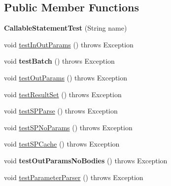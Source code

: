 \subsection*{Public Member Functions}
\begin{DoxyCompactItemize}
\item 
\mbox{\label{classtestsuite_1_1simple_1_1_callable_statement_test_aea47c080476cb1ba38504913a365d668}} 
{\bfseries Callable\+Statement\+Test} (String name)
\item 
void \mbox{\hyperlink{classtestsuite_1_1simple_1_1_callable_statement_test_aff9447e7125f78c20b0eab4c5646b013}{test\+In\+Out\+Params}} ()  throws Exception 
\item 
\mbox{\label{classtestsuite_1_1simple_1_1_callable_statement_test_ab56a0db2ddecf45b3dbcf0505a0e29dd}} 
void {\bfseries test\+Batch} ()  throws Exception 
\item 
void \mbox{\hyperlink{classtestsuite_1_1simple_1_1_callable_statement_test_a1b410c096cba5e99995e4e3fb465a1b7}{test\+Out\+Params}} ()  throws Exception 
\item 
void \mbox{\hyperlink{classtestsuite_1_1simple_1_1_callable_statement_test_a8007b7089823f54d85bc02cf1c5427e8}{test\+Result\+Set}} ()  throws Exception 
\item 
void \mbox{\hyperlink{classtestsuite_1_1simple_1_1_callable_statement_test_ad2d1ffaddb39bf287b37661e592ef2f6}{test\+S\+P\+Parse}} ()  throws Exception 
\item 
void \mbox{\hyperlink{classtestsuite_1_1simple_1_1_callable_statement_test_a5382df497dce2b6ecd935d4550a5b505}{test\+S\+P\+No\+Params}} ()  throws Exception 
\item 
void \mbox{\hyperlink{classtestsuite_1_1simple_1_1_callable_statement_test_ac41eeda6e62222c52818858c877b29f3}{test\+S\+P\+Cache}} ()  throws Exception 
\item 
\mbox{\label{classtestsuite_1_1simple_1_1_callable_statement_test_a179baddfa438453902f8136cb9cd1041}} 
void {\bfseries test\+Out\+Params\+No\+Bodies} ()  throws Exception 
\item 
void \mbox{\hyperlink{classtestsuite_1_1simple_1_1_callable_statement_test_a0586bd82e4c828405b924bb8262f464c}{test\+Parameter\+Parser}} ()  throws Exception 
\end{DoxyCompactItemize}
